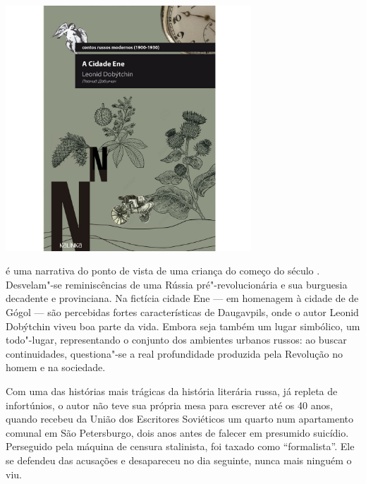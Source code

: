 \begin{center}
\hspace*{-2.5cm}
\hspace*{2.5cm}\includegraphics[width=92mm]{./grid/cidaden.jpg}
\end{center}

\hspace*{-7cm}\hrulefill\hspace*{-7cm}

\medskip

 é uma narrativa do ponto de vista de uma criança do começo do século . Desvelam"-se reminiscências de uma Rússia pré"-revolucionária e sua burguesia decadente e provinciana. Na fictícia cidade Ene --- em homenagem à cidade de {} de Gógol --- são percebidas fortes características de Daugavpils, onde o autor Leonid Dobýtchin viveu boa parte da vida. Embora seja também um lugar simbólico, um todo"-lugar, representando o conjunto dos ambientes urbanos russos: ao buscar continuidades, questiona"-se a real profundidade produzida pela Revolução  no homem e na sociedade.

Com uma das histórias mais trágicas da história literária russa, já repleta de infortúnios, o autor não teve sua própria mesa para escrever até os 40 anos, quando recebeu da União dos Escritores Soviéticos um quarto num apartamento comunal em São Petersburgo, dois anos antes de falecer em presumido suicídio. Perseguido pela máquina de censura stalinista, foi taxado como “formalista”. Ele se defendeu das acusações e desapareceu no dia seguinte, nunca mais ninguém o viu.

